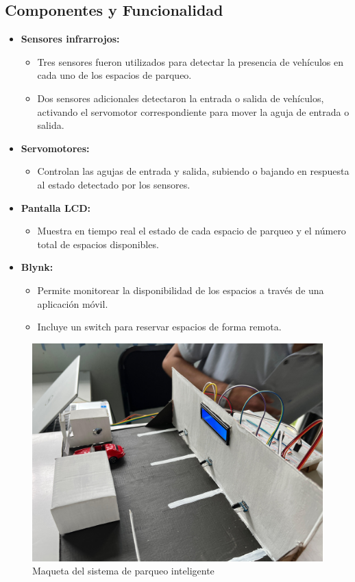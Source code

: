 \documentclass[12pt,a4paper]{article}
\begin{document}
\subsection{Componentes y Funcionalidad}
\begin{itemize}
    \item \textbf{Sensores infrarrojos:}
    \begin{itemize}
        \item Tres sensores fueron utilizados para detectar la presencia de vehículos en cada uno de los espacios de parqueo.
        \item Dos sensores adicionales detectaron la entrada o salida de vehículos, activando el servomotor correspondiente para mover la aguja de entrada o salida.
    \end{itemize}

    \item \textbf{Servomotores:}
    \begin{itemize}
        \item Controlan las agujas de entrada y salida, subiendo o bajando en respuesta al estado detectado por los sensores.
    \end{itemize}

    \item \textbf{Pantalla LCD:}
    \begin{itemize}
        \item Muestra en tiempo real el estado de cada espacio de parqueo y el número total de espacios disponibles.
    \end{itemize}

    \item \textbf{Blynk:}
    \begin{itemize}
        \item Permite monitorear la disponibilidad de los espacios a través de una aplicación móvil.
        \item Incluye un switch para reservar espacios de forma remota.
    \end{itemize}
\end{itemize}

\begin{figure}[H]
    \centering
    \includegraphics[width=0.8\linewidth]{Imagenes/inicial.jpeg}
    \caption{Maqueta del sistema de parqueo inteligente}
    \label{fig:100}
\end{figure}
\end{document}
